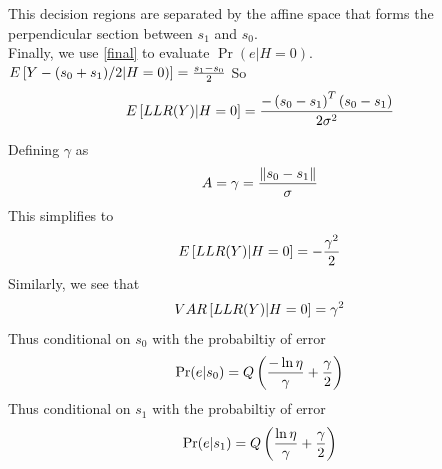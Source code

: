 \begin{enumerate}
This decision regions are separated  by the affine space that forms the perpendicular section between $s_1$ and $s_0$. \\
Finally, we use \ref{final} to evaluate 
$\Pr(e | H =0)$. $E{}\left[ Y -(s_0 +s_1)/2|H=0)\right] = \frac{s_1 -s_0}{2}$ So
\begin{align}
E{}\left[LLR(Y)|H=0\right] = \frac{-\left(s_0 -s_1\right)^T\left(s_0 -s_1\right)}{2\sigma^2}
\label{lastqsn}
\end{align}





Defining $\gamma$ as
\begin{align}
A = \gamma = \frac{\left\lVert s_0 -s_1\right\rVert}{\sigma}
\end{align}
This simplifies to
\begin{align}
E{}\left[LLR(Y)|H=0\right] = -\frac{\gamma^2}{2}
\end{align} 
Similarly, we see that
\begin{align}
VAR{}\left[LLR(Y)|H=0\right] = \gamma^2
\end{align}
Thus conditional on $s_0$ with the probabiltiy of error 
\begin{align}
\Pr(e |s_0) = Q\left(\frac{-\ln{\eta}}{\gamma}+\frac{\gamma}{2}\right)
\end{align}
Thus conditional on $s_1$ with the probabiltiy of error 
\begin{align}
\Pr(e |s_1) = Q\left(\frac{\ln{\eta}}{\gamma}+\frac{\gamma}{2}\right)
\end{align}




\end{enumerate}

